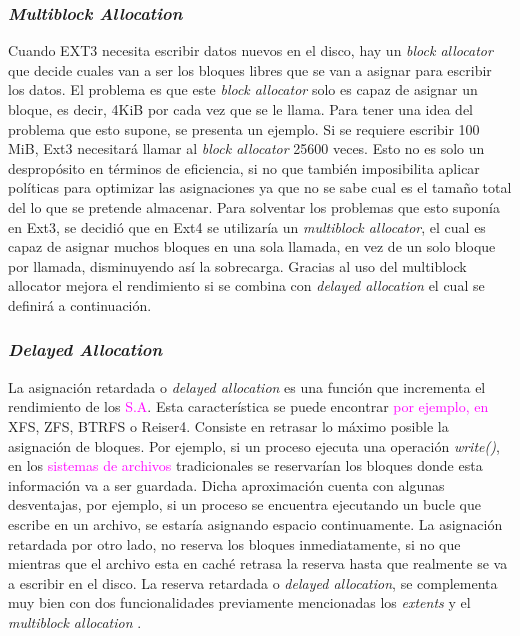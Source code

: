 \subsubsection{\textit{Multiblock Allocation}}
Cuando EXT3 necesita escribir datos nuevos en el disco, hay un \textit{block allocator} que decide cuales van a ser los bloques libres que se van a asignar para escribir los datos. El problema es que este \textit{block allocator} solo es capaz de asignar un bloque, es decir, 4KiB por cada vez que se le llama. Para tener una idea del problema que esto supone, se presenta un ejemplo. Si se requiere escribir 100 MiB, Ext3 necesitará llamar al \textit{block allocator} 25600 veces. Esto no es solo un despropósito en términos de eficiencia, si no que también imposibilita aplicar políticas para optimizar las asignaciones ya que no se sabe cual es el tamaño total del lo que se pretende almacenar. Para solventar los problemas que esto suponía en Ext3, se decidió que en Ext4 se utilizaría un \textit{multiblock allocator}, el cual es capaz de asignar muchos bloques en una sola llamada, en vez de un solo bloque por llamada, disminuyendo así la sobrecarga. Gracias al uso del multiblock allocator mejora el rendimiento si se combina  con \textit{delayed allocation} el cual se definirá  a continuación. \cite{ext4howto} \\


\subsubsection{\textit{Delayed Allocation}}
La asignación retardada o \textit{delayed allocation} es una función que incrementa el rendimiento de los \textcolor{magenta}{S.A}. Esta característica se puede encontrar \textcolor{magenta}{por ejemplo, en} XFS, ZFS, BTRFS o Reiser4. Consiste en retrasar lo máximo posible la asignación de bloques. Por ejemplo, si un proceso ejecuta una operación \textit{write()}, en los \textcolor{magenta}{sistemas de archivos} tradicionales se reservarían los bloques donde esta información va a ser guardada. Dicha aproximación cuenta con algunas desventajas, por ejemplo, si un proceso se encuentra ejecutando un bucle que escribe en un archivo, se estaría asignando espacio continuamente. La asignación retardada por otro lado, no reserva los bloques inmediatamente, si no que mientras que el archivo esta en caché retrasa la reserva hasta que realmente se va a escribir en el disco. 
La reserva retardada o \textit{delayed allocation}, se complementa muy bien con dos funcionalidades previamente mencionadas los \textit{extents} y el \textit{multiblock allocation} \cite{ext4howto}.




